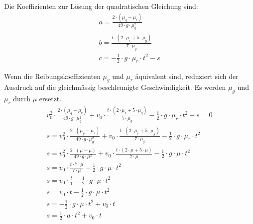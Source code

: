 Die Koeffizienten zur Lösung der quadratischen Gleichung sind:
\begin{align}
    a = \frac{2 \cdot (\mu_g - \mu_r)}{49 \cdot g \cdot \mu_g^2}\\
    b = \frac{t \cdot (2 \cdot \mu_r + 5 \cdot \mu_g)}{7 \cdot \mu_g}\\
    c = - \frac{1}{2} \cdot g \cdot \mu_r \cdot t^2 - s
\end{align}

Wenn die Reibungskoeffizienten $\mu_g$ und $\mu_r$ äquivalent sind, reduziert sich der Ausdruck auf die gleichmässig beschleunigte
Geschwindigkeit. Es werden $\mu_g$ und $\mu_r$ durch $\mu$ ersetzt.
\begin{align}
    v_0^2 \cdot \frac{2 \cdot (\mu_g - \mu_r)}{49 \cdot g \cdot \mu_g^2} + v_0 \cdot \frac{t \cdot (2 \cdot \mu_r + 5 \cdot \mu_g)}{7 \cdot \mu_g} - \frac{1}{2} \cdot g \cdot \mu_r \cdot t^2 - s = 0\\
    s = v_0^2 \cdot \frac{2 \cdot (\mu_g - \mu_r)}{49 \cdot g \cdot \mu_g^2} + v_0 \cdot \frac{t \cdot (2 \cdot \mu_r + 5 \cdot \mu_g)}{7 \cdot \mu_g} - \frac{1}{2} \cdot g \cdot \mu_r \cdot t^2\\
    s = v_0^2 \cdot \frac{2 \cdot (\mu - \mu)}{49 \cdot g \cdot \mu^2} + v_0 \cdot \frac{t \cdot (2 \cdot \mu + 5 \cdot \mu)}{7 \cdot \mu} - \frac{1}{2} \cdot g \cdot \mu \cdot t^2\\
    s = v_0 \cdot \frac{t \cdot 7 \cdot \mu}{7 \cdot \mu} - \frac{1}{2} \cdot g \cdot \mu \cdot t^2\\
    s = v_0 \cdot \frac{t}{1} - \frac{1}{2} \cdot g \cdot \mu \cdot t^2\\
    s = v_0 \cdot t - \frac{1}{2} \cdot g \cdot \mu \cdot t^2\\
    s = - \frac{1}{2} \cdot g \cdot \mu \cdot t^2 + v_0 \cdot t\\
    s = \frac{1}{2} \cdot a \cdot t^2 + v_0 \cdot t
\end{align}